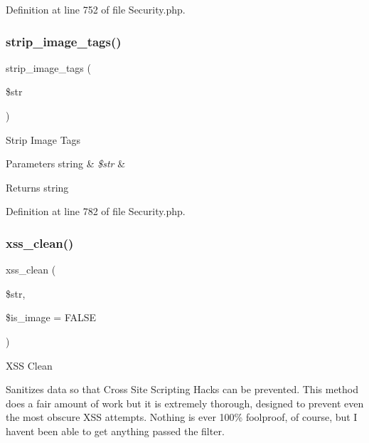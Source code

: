 Definition at line 752 of file Security.\+php.

\mbox{\label{class_c_i___security_abb836a42971c7bc641588db779c6ab1d}} 
\subsubsection{\texorpdfstring{strip\_image\_tags()}{strip\_image\_tags()}}
{\footnotesize\ttfamily strip\+\_\+image\+\_\+tags (\begin{DoxyParamCaption}\item[{}]{\$str }\end{DoxyParamCaption})}

Strip Image Tags


\begin{DoxyParams}[1]{Parameters}
string & {\em \$str} & \\
\hline
\end{DoxyParams}
\begin{DoxyReturn}{Returns}
string 
\end{DoxyReturn}


Definition at line 782 of file Security.\+php.

\mbox{\label{class_c_i___security_acb759426dbab128d3d8164805225381c}} 
\subsubsection{\texorpdfstring{xss\_clean()}{xss\_clean()}}
{\footnotesize\ttfamily xss\+\_\+clean (\begin{DoxyParamCaption}\item[{}]{\$str,  }\item[{}]{\$is\+\_\+image = {\ttfamily FALSE} }\end{DoxyParamCaption})}

X\+SS Clean

Sanitizes data so that Cross Site Scripting Hacks can be prevented. This method does a fair amount of work but it is extremely thorough, designed to prevent even the most obscure X\+SS attempts. Nothing is ever 100\% foolproof, of course, but I haven\textquotesingle{}t been able to get anything passed the filter.

